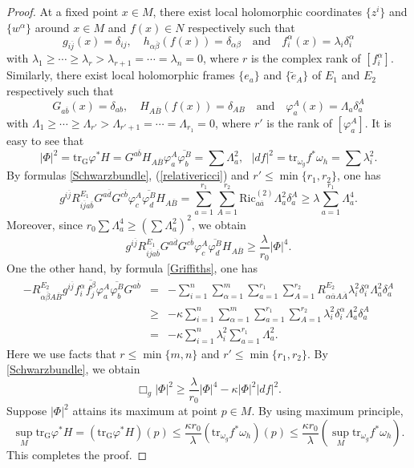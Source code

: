 \documentclass[12pt]{amsart}
\theoremstyle{plain}
\theoremstyle{definition}
\newcommand{\bproof}{\begin{proof}}
\newcommand{\eproof}{\end{proof}}
\renewcommand{\bar}{\overline}
\renewcommand{\phi}{\varphi}
\newcommand{\beq}{\begin{equation}}
\newcommand{\eeq}{\end{equation}}
\newcommand{\ee}{\end{eqnarray*}}
\newcommand{\be}{\begin{eqnarray*}}
\renewcommand{\tilde}{\widetilde}
\newcommand{\qtq}[1]{\quad\mbox{#1}\quad}
\renewcommand{\>}{\rightarrow}
\newcommand{\Ric}{\mathrm{Ric}}
\numberwithin{equation}{section} %
\begin{document}
\bproof
At a fixed point $x\in M$, there exist local holomorphic coordinates $\{z^i\}$ and $\{w^\alpha\}$ around $x\in M$ and $f(x)\in N$ respectively such that
\[
g_{i\bar j}(x)=\delta_{ij},\quad
h_{\alpha\bar\beta}(f(x))=\delta_{\alpha\beta}
\qtq{and} f_i^\alpha(x)=\lambda_i\delta_i^\alpha
\]
with $\lambda_1\ge\cdots\ge\lambda_r>\lambda_{r+1}=\cdots=\lambda_n=0$, where $r$ is the complex rank of $\left[f_i^\alpha\right]$.
Similarly, there exist local holomorphic frames $\{e_a\}$ and $\{\tilde e_A\}$ of $E_1$ and $E_2$ respectively such that
\[
G_{a\bar b}(x)=\delta_{ab},\quad
H_{A\bar B}(f(x))=\delta_{A B}
\qtq{and} \phi_a^A(x)=\Lambda_a\delta_a^A
\]
with $\Lambda_1\ge\cdots\ge\Lambda_{r'}>\Lambda_{r'+1}=\cdots=\Lambda_{r_1}=0$, where $r'$ is the rank of $\left[\phi_a^A\right]$. It is easy to see that
$$|\Phi|^2= \mathrm{tr_G}\phi^* H=G^{a\bar b}H_{A\bar B} \phi^A_a\bar{\phi^B_b}=\sum \Lambda_a^2,\ \ \ |df|^2=\mathrm{tr}_{\omega_g} f^*\omega_h=\sum \lambda_i^2.$$
By  formulas \eqref{Schwarzbundle}, (\ref{relativericci}) and $r'\leq \min\{r_1,r_2\}$, one has
\beq g^{i\bar j}R^{E_1}_{i\bar ja\bar b} G^{a\bar d}G^{c\bar b}\phi_c^A \bar{\phi_d^B} H_{A\bar B }=
\sum_{a=1}^{r_1}\sum_{A=1}^{r_2}\Ric^{(2)}_{a\bar a} \Lambda_a^2\delta_a^A\geq  \lambda\sum_{a=1}^{r_1} \Lambda_a^4.  \eeq
Moreover, since $r_0\sum \Lambda_a^4\geq \left(\sum \Lambda_a^2\right)^2 $, we obtain
\beq g^{i\bar j}R^{E_1}_{i\bar ja\bar b} G^{a\bar d}G^{c\bar b}\phi_c^A \bar{\phi_d^B} H_{A\bar B }\geq  \frac{\lambda}{r_0} |\Phi|^4. \eeq
One the other hand, by formula \eqref{Griffiths}, one has 
\be -R^{E_2}_{\alpha\bar \beta A\bar B} g^{i\bar j}f_i^\alpha\bar{f_j^\beta} \phi_a^A\bar{\phi_b^B} G^{a\bar b}&=&-\sum_{i=1}^n\sum_{\alpha=1}^m \sum_{a=1}^{r_1}\sum_{A=1}^{r_2}
R^{E_2}_{\alpha\bar \alpha A\bar A} \lambda_i^2\delta_i^\alpha \Lambda_a^2\delta_a^A\\&\geq& -\kappa\sum_{i=1}^n\sum_{\alpha=1}^m \sum_{a=1}^{r_1}\sum_{A=1}^{r_2}
\lambda_i^2\delta_i^\alpha \Lambda_a^2\delta_a^A\\
&=&-\kappa\sum_{i=1}^n \lambda_i^2 \sum_{a=1}^{r_1}\Lambda_a^2.\ee
Here we use  facts that $r\leq \min\{m,n\}$ and $r'\leq \min\{r_1,r_2\}$.
By \eqref{Schwarzbundle},  we  obtain
\beq \Box_g|\Phi|^2  \ge  \frac{\lambda}{r_0} |\Phi|^4-\kappa|\Phi|^2|df|^2.\eeq
Suppose $|\Phi|^2$ attains its maximum at point $p\in M$.  By using maximum principle, 
$$\sup_M \mathrm{tr_G}\phi^* H = \left( \mathrm{tr_G}\phi^* H\right)(p)\le \frac{\kappa r_0}{\lambda}\left(\mathrm{tr}_{\omega_g} f^*\omega_h\right)(p)\le \frac{\kappa r_0}{\lambda}\left(\sup_M \mathrm{tr}_{\omega_g} f^*\omega_h\right).$$
This completes the proof.
\eproof
\end{document}
